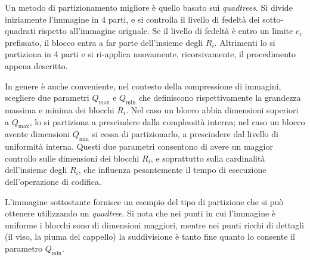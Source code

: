 \documentclass[11pt,a4paper,appendixprefix=true,numbers=noenddot]{scrreprt}
\begin{document}
Un metodo di partizionamento migliore è quello basato sui \emph{quadtrees}. Si divide iniziamente l'immagine in 4 parti, e si controlla il livello di fedeltà dei sotto-quadrati rispetto all'immagine orignale. Se il livello di fedeltà è entro un limite $e_c$ prefissato, il blocco entra a far parte dell'insieme degli $R_i$. Altrimenti lo si partiziona in 4 parti e si ri-applica nuovamente, ricorsivamente, il procedimento appena descritto.

In genere è anche conveniente, nel contesto della compressione di immagini, scegliere due parametri $Q_{\text{max}}$ e $Q_{\text{min}}$ che definiscono rispettivamente la grandezza massima e minima dei blocchi $R_i$. Nel caso un blocco abbia dimensioni superiori a $Q_{\text{max}}$, lo si partiziona a prescindere dalla complessità interna; nel caso un blocco avente dimensioni $Q_{\text{min}}$ si cessa di partizionarlo, a prescindere dal livello di uniformità interna. Questi due parametri consentono di avere un maggior controllo sulle dimensioni dei blocchi $R_i$, e soprattutto sulla cardinalità dell'insieme degli $R_i$, che influenza pesantemente il tempo di esecuzione dell'operazione di codifica.

L'immagine sottostante fornisce un esempio del tipo di partizione che si può ottenere utilizzando un \emph{quadtree}. Si nota che nei punti in cui l'immagine è uniforme i blocchi sono di dimensioni maggiori, mentre nei punti ricchi di dettagli (il viso, la piuma del cappello) la suddivisione è tanto fine quanto lo consente il parametro $Q_{\text{min}}$.
\end{document}
